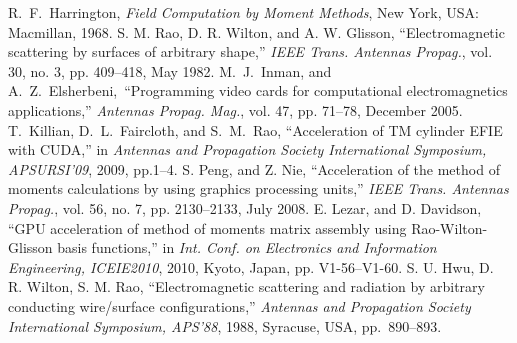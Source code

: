 \begin{thebibliography}{99}
%
R.~F.~Harrington, \emph{Field Computation by
Moment Methods}, New York, USA: Macmillan, 1968.
%
S. M. Rao, D. R. Wilton, and A. W. Glisson, ``Electromagnetic scattering by surfaces of arbitrary shape,'' \emph{IEEE Trans. Antennas Propag.}, vol. 30, no. 3, pp. 409--418, May 1982.
%
M.~J.~Inman, and A.~Z.~Elsherbeni,~``Programming video cards for computational electromagnetics applications,'' \emph{Antennas Propag. Mag.}, vol. 47, pp. 71–78, December 2005.
%
T.~Killian, D.~L.~Faircloth, and S.~M.~Rao, ``Acceleration of TM cylinder EFIE with CUDA,'' in  \emph{Antennas and Propagation Society International Symposium, APSURSI'09}, 2009, pp.1--4.
%
S. Peng, and Z. Nie, ``Acceleration of the method of moments calculations by using graphics processing units,'' \emph{IEEE Trans. Antennas Propag.}, vol. 56, no. 7, pp. 2130--2133, July 2008.
%
E. Lezar, and D. Davidson, ``GPU acceleration of method of moments
matrix assembly using Rao-Wilton-Glisson basis functions,'' in \emph{Int. Conf.
on Electronics and Information Engineering, ICEIE2010}, 2010, Kyoto,
Japan, pp. V1-56--V1-60.
%
%
S. U. Hwu, D. R. Wilton, S. M. Rao, ``Electromagnetic scattering and radiation by arbitrary conducting wire/surface configurations,'' \emph{Antennas and Propagation Society International Symposium, APS'88}, 1988, Syracuse, USA, pp.~890--893. 
%
\end{thebibliography}
